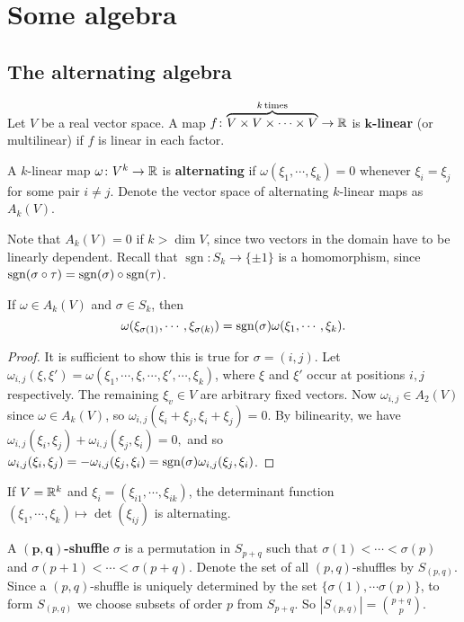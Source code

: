 \section{Some algebra} 
\subsection{The alternating algebra}
Let $V$ be a real vector space. A map $
f \colon \overset{k \, \text{times} }{\overbrace{V\times V\times \cdots \times V} }  \to \mathbb{R}$ is $\mathbf k$\textbf{-linear} (or multilinear) if $f$ is linear in each factor.
\begin{definition}[]
    A $k$-linear map $\omega \colon V^k \to \mathbb{R}$ is \textbf{alternating} if $\omega(\xi_1,\cdots ,\xi_k)=0$ whenever $\xi_i =\xi_j $ for some pair $i\neq j$. Denote the vector space of alternating $k$-linear maps as $A_k(V)$.
\end{definition}
Note that $A_k(V)=0$ if $k>\dim V$, since two vectors in the domain have to be linearly dependent. Recall that $\operatorname{sgn} \colon S_k \to \{\pm 1\} $ is a homomorphism, since $\operatorname{sgn}(\sigma \circ \tau)=\operatorname{sgn}(\sigma) \circ \operatorname{sgn}(\tau)$.
\begin{lemma}\label{alt} 
    If $\omega \in A_k(V)$ and $\sigma \in S_k$, then \[
        \omega(\xi _{\sigma(1)},\cdots ,\xi_{\sigma(k)})=\operatorname{sgn}(\sigma)\omega(\xi_1,\cdots ,\xi_k).
    \] 
\end{lemma}
\begin{proof}
    It is sufficient to show this is true for $\sigma=(i,j)$. Let $\omega_{i,j}(\xi,\xi')=\omega(\xi_1,\cdots ,\xi,\cdots ,\xi',\cdots ,\xi_k)$, where $\xi$ and $\xi'$ occur at positions $i,j$ respectively. The remaining $\xi_v \in V$ are arbitrary fixed vectors. Now $\omega _{i,j}\in A_2(V)$ since $\omega \in A_k(V)$, so $\omega _{i,j}(\xi_i +\xi_j ,\xi_i +\xi_j )=0$. By bilinearity, we have $\omega_{i,j}(\xi_i ,\xi_j )+\omega_{i,j}(\xi_j ,\xi_i )=0,$ and so $\omega _{i,j}(\xi_i ,\xi_j )=-\omega _{i,j}(\xi_j ,\xi_i )=\operatorname{sgn}(\sigma)\omega _{i,j}(\xi_j ,\xi_i )$.
\end{proof}
\begin{example}
    If $V=\mathbb{R}^k$ and $\xi_i =(\xi_{i1},\cdots ,\xi_{ik})$, the determinant function $(\xi_1,\cdots ,\xi_k) \mapsto \det(\xi_{ij})$ is alternating.
\end{example}
\begin{definition}[]
    A $\mathbf { (p,q)}$\textbf{-shuffle} $\sigma$ is a permutation in $S_{p+q}$ such that $\sigma(1)< \cdots < \sigma(p)$ and $\sigma(p+1)< \cdots  < \sigma(p+q)$. Denote the set of all $(p,q)$-shuffles by $S_{(p,q)}$. Since a $(p,q)$-shuffle is uniquely determined by the set $\{\sigma(1),\cdots \sigma(p)\} $, to form $S_{(p,q)}$ we choose subsets of order $p$ from  $S_{p+q}$. So $|S_{(p,q)}|={p+q\choose p} $.
\end{definition}
